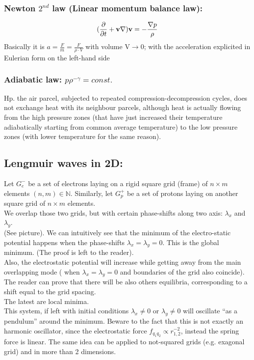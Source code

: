 \documentclass[a4paper,11pt]{article}
\begin{document}
\subsubsection{ Newton $2^{nd}$ law (Linear momentum balance law):}
\[   (\pdv{}{t}+\mathbf{v}\nabla)\mathbf{v}=- \frac{\nabla p}{\rho} \]
Basically it is $a=\frac{F}{m}=\frac{F}{\rho \cdot V}$ with volume V$\rightarrow 0$; with the acceleration explicited in Eulerian form on the left-hand side
\subsubsection{Adiabatic law: $p \rho^{-\gamma}=const.$}
Hp. the air parcel, subjected to repeated compression-decompression cycles, does not exchange heat with its neighbour parcels, although heat is actually flowing from the high pressure zones (that have just increased their temperature adiabatically starting from common average temperature) to the low pressure zones (with lower temperature for the same reason).

\subsection{Lengmuir waves in 2D:}
Let $G_e^-$ be a set of electrons laying on a rigid square grid (frame) of $n \times m$ elements $(n,m) \in \mathbb{N}$. Similarly, let $G_p^+$ be a set of protons laying on another square grid of  $n \times m$ elements. \\
We overlap those two grids, but with certain phase-shifts along two axis: $\lambda_x$ and $\lambda_y$. \\ (See picture). %
We can intuitively see that the minimum of the electro-static potential happens when the phase-shifts $\lambda_x=\lambda_y=0$. 
This is the global minimum. (The proof is left to the reader). \\
Also, the electrostatic potential will increase while getting away from the main overlapping mode ( when $\lambda_x=\lambda_y=0$ and boundaries of the grid also coincide).
The reader can prove that there will be also others equilibria, corresponding to a shift equal to the grid spacing. \\ The latest are local minima.\\ %

This system, if left with initial conditions $\lambda_x \neq 0 $ or $\lambda_y \neq 0 $ will oscillate ``as a pendulum'' around the minimum. 
Beware to the fact that this is not exactly an harmonic oscillator, since the electrostatic force $f_{q_1 q_2} \propto r_{1,2}^{-2}$, instead the spring force is linear.
The same idea can be applied to not-squared grids (e.g. exagonal grid) and in more than 2 dimensions.
\end{document}
